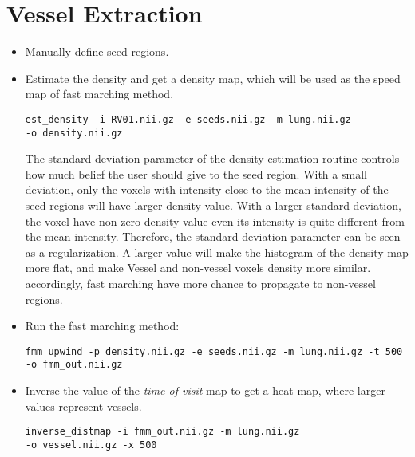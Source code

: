 \documentclass[11pt]{article}
\begin{document}
\section{Vessel Extraction}
\begin{itemize}
\item Manually define seed regions.

\item Estimate the density and get a density map, which will be used as the
  speed map of fast marching method. 
\begin{Verbatim}[frame=single]
est_density -i RV01.nii.gz -e seeds.nii.gz -m lung.nii.gz 
-o density.nii.gz
\end{Verbatim}
The standard deviation parameter of the density estimation routine controls
how much belief the user should give to the seed region. With a small
deviation, only the voxels with intensity close to the mean intensity of the
seed regions will have larger density value. With a larger standard deviation,
the voxel have non-zero density value even its intensity is quite different
from the mean intensity. Therefore, the standard deviation parameter can be
seen as a regularization. A larger value will make the histogram of the
density map more flat, and make Vessel and non-vessel voxels density more
similar. accordingly, fast marching have more chance to propagate to
non-vessel regions.

  \item Run the fast marching method:
\begin{Verbatim}[frame=single]
fmm_upwind -p density.nii.gz -e seeds.nii.gz -m lung.nii.gz -t 500 
-o fmm_out.nii.gz
\end{Verbatim}

\item Inverse the value of the \emph{time of visit} map to get a heat map,
  where larger values represent vessels. 
\begin{Verbatim}[frame=single]
inverse_distmap -i fmm_out.nii.gz -m lung.nii.gz 
-o vessel.nii.gz -x 500
\end{Verbatim}
\end{itemize}



\end{document}
